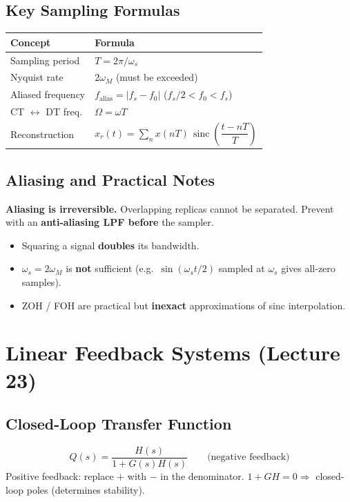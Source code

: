 \documentclass[11pt]{article}
\begin{document}
\subsection{Key Sampling Formulas}
\begin{center}
\begin{tabular}{ll}
\toprule
Concept & Formula \\
\midrule
Sampling period & $T = 2\pi / \omega_s$ \\
Nyquist rate & $2\omega_M$ (must be exceeded) \\
Aliased frequency & $f_\text{alias} = |f_s - f_0|$ ($f_s/2 < f_0 < f_s$) \\
CT $\leftrightarrow$ DT freq. & $\Omega = \omega T$ \\
Reconstruction & $x_r(t) = \sum_n x(nT)\,\operatorname{sinc}\!\left(\dfrac{t - nT}{T}\right)$ \\
\bottomrule
\end{tabular}
\end{center}

\subsection{Aliasing and Practical Notes}
\textbf{Aliasing is irreversible.} Overlapping replicas cannot be separated. Prevent with an \textbf{anti-aliasing LPF before} the sampler.
\begin{itemize}
  \item Squaring a signal \textbf{doubles} its bandwidth.
  \item $\omega_s = 2\omega_M$ is \textbf{not} sufficient (e.g.\ $\sin(\omega_s t/2)$ sampled at $\omega_s$ gives all-zero samples).
  \item ZOH / FOH are practical but \textbf{inexact} approximations of sinc interpolation.
\end{itemize}

\section{Linear Feedback Systems (Lecture 23)}

\subsection{Closed-Loop Transfer Function}
\[ Q(s) = \frac{H(s)}{1 + G(s)H(s)} \qquad \text{(negative feedback)} \]
Positive feedback: replace $+$ with $-$ in the denominator. $1 + GH = 0 \Rightarrow$ closed-loop poles (determines stability).
\end{document}

